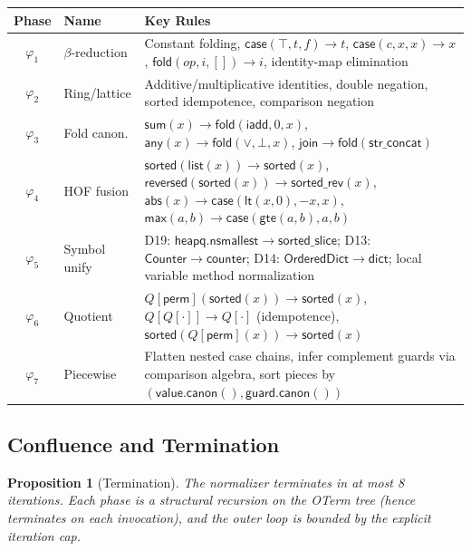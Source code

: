 \documentclass[11pt,a4paper]{report}
\theoremstyle{definition}
\theoremstyle{plain}
\newtheorem{proposition}[definition]{Proposition}
\newcommand{\fold}{\mathsf{fold}}
\begin{document}
\begin{center}
\begin{tabular}{clp{6.5cm}}
\hline
\textbf{Phase} & \textbf{Name} & \textbf{Key Rules} \\
\hline
$\varphi_1$ & $\beta$-reduction
  & Constant folding, $\mathsf{case}(\top, t, f) \to t$,
    $\mathsf{case}(c, x, x) \to x$, $\fold(\mathit{op}, i, []) \to i$,
    identity-map elimination \\
$\varphi_2$ & Ring/lattice
  & Additive/multiplicative identities, double negation, sorted
    idempotence, comparison negation \\
$\varphi_3$ & Fold canon.
  & $\mathsf{sum}(x) \to \fold(\mathsf{iadd}, 0, x)$,
    $\mathsf{any}(x) \to \fold(\lor, \bot, x)$,
    $\mathsf{join} \to \fold(\mathsf{str\_concat})$ \\
$\varphi_4$ & HOF fusion
  & $\mathsf{sorted}(\mathsf{list}(x)) \to \mathsf{sorted}(x)$,
    $\mathsf{reversed}(\mathsf{sorted}(x)) \to \mathsf{sorted\_rev}(x)$,
    $\mathsf{abs}(x) \to \mathsf{case}(\mathsf{lt}(x,0), -x, x)$,
    $\mathsf{max}(a,b) \to \mathsf{case}(\mathsf{gte}(a,b), a, b)$ \\
$\varphi_5$ & Symbol unify
  & D19: $\mathsf{heapq.nsmallest} \to \mathsf{sorted\_slice}$;
    D13: $\mathsf{Counter} \to \mathsf{counter}$;
    D14: $\mathsf{OrderedDict} \to \mathsf{dict}$;
    local variable method normalization \\
$\varphi_6$ & Quotient
  & $Q[\mathsf{perm}](\mathsf{sorted}(x)) \to \mathsf{sorted}(x)$,
    $Q[Q[\cdot]] \to Q[\cdot]$ (idempotence),
    $\mathsf{sorted}(Q[\mathsf{perm}](x)) \to \mathsf{sorted}(x)$ \\
$\varphi_7$ & Piecewise
  & Flatten nested case chains, infer complement guards via
    comparison algebra, sort pieces by
    $(\mathsf{value.canon()}, \mathsf{guard.canon()})$ \\
\hline
\end{tabular}
\end{center}

\subsection{Confluence and Termination}

\begin{proposition}[Termination]
\label{prop:normalizer-termination}
The normalizer terminates in at most 8 iterations.  Each phase is
a structural recursion on the OTerm tree (hence terminates on each
invocation), and the outer loop is bounded by the explicit iteration
cap.
\end{proposition}
\end{document}

